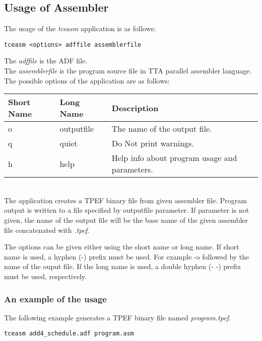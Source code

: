 \documentclass[twoside]{tceusermanual}
\begin{document}
\subsection{Usage of Assembler}

The usage of the \emph{tceasm} application is as follows:

\begin{verbatim}
tceasm <options> adffile assemblerfile
\end{verbatim}

The \emph{adffile} is the ADF file.\\
The \emph{assemblerfile} is the program source file in TTA parallel assembler
language.\\

The possible options of the application are as follows:\\

\begin{tabular}{p{}p{}
                p{}}
\textbf{Short Name} &\textbf{Long Name} &\textbf{Description} \\
\hline
o & outputfile  & The name of the output file.\\
q & quiet       & Do Not print warnings.\\
h & help        & Help info about program usage and parameters.\\
\end{tabular}\\

The application creates a TPEF binary file from given assembler file. 
Program output is written to a file specified by outputfile parameter. If
parameter is not given, the name of the output file will be the base name of
the given assembler file concatenated with \emph{.tpef}.

The options can be given either using the short name or long name. If
short name is used, a hyphen (-) prefix must be used. For example -o
followed by the name of the ouput file. If the long name is used, a
double hyphen (- -) prefix must be used, respectively.

\subsubsection{An example of the usage}

The following example generates a TPEF binary file named \emph{program.tpef}.
 
\begin{verbatim}
tceasm add4_schedule.adf program.asm
\end{verbatim}
\end{document}
